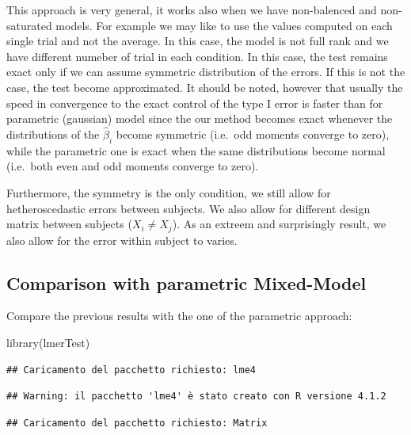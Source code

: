 \documentclass[
]{article}
\newenvironment{Shaded}{\begin{snugshade}}{\end{snugshade}}
\newcommand{\FunctionTok}[1]{\textcolor[rgb]{0.00,0.00,0.00}{#1}}
\newcommand{\NormalTok}[1]{#1}
\begin{document}
This approach is very general, it works also when we have non-balenced
and non-saturated models. For example we may like to use the values
computed on each single trial and not the average. In this case, the
model is not full rank and we have different numeber of trial in each
condition. In this case, the test remains exact only if we can assume
symmetric distribution of the errors. If this is not the case, the test
become approximated. It should be noted, however that usually the speed
in convergence to the exact control of the type I error is faster than
for parametric (gaussian) model since the our method becomes exact
whenever the distributions of the \(\hat\beta_i\) become symmetric
(i.e.~odd moments converge to zero), while the parametric one is exact
when the same distributions become normal (i.e.~both even and odd
moments converge to zero).

Furthermore, the symmetry is the only condition, we still allow for
hetheroscedastic errors between subjects. We also allow for different
design matrix between subjects (\(X_i\neq X_j\)). As an extreem and
surprisingly result, we also allow for the error within subject to
varies.

\hypertarget{comparison-with-parametric-mixed-model}{%
\subsection{Comparison with parametric
Mixed-Model}\label{comparison-with-parametric-mixed-model}}

Compare the previous results with the one of the parametric approach:

\begin{Shaded}
\begin{Highlighting}[]
\FunctionTok{library}\NormalTok{(lmerTest)}
\end{Highlighting}
\end{Shaded}

\begin{verbatim}
## Caricamento del pacchetto richiesto: lme4
\end{verbatim}

\begin{verbatim}
## Warning: il pacchetto 'lme4' è stato creato con R versione 4.1.2
\end{verbatim}

\begin{verbatim}
## Caricamento del pacchetto richiesto: Matrix
\end{verbatim}
\end{document}

